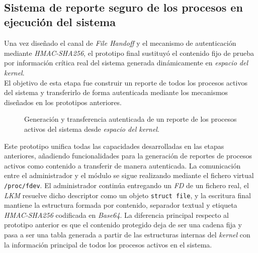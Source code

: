 \

\subsection{Sistema de reporte seguro de los procesos en ejecución del sistema}

Una vez diseñado el canal de \textit{File Handoff} y el mecanismo de autenticación mediante \textit{HMAC-SHA256}, el prototipo final sustituyó el contenido fijo de prueba por información crítica real del sistema generada dinámicamente en \textit{espacio del kernel}.\\

El objetivo de esta etapa fue construir un reporte de todos los procesos activos del sistema y transferirlo de forma autenticada mediante los mecanismos diseñados en los prototipos anteriores.

\newpage

\begin{figure}[h!]
  \centering
  \scalebox{0.95}{}
  \caption{Generación y transferencia autenticada de un reporte de los procesos activos del sistema desde \textit{espacio del kernel}.}
  \label{fig:final_report_scheme}
\end{figure}

Este prototipo unifica todas las capacidades desarrolladas en las etapas anteriores, añadiendo funcionalidades para la generación de reportes de procesos activos como contenido a transferir de manera autenticada.
La comunicación entre el administrador y el módulo se sigue realizando mediante el fichero virtual \texttt{/proc/fdev}. El administrador continúa entregando un \textit{FD} de un fichero real, el \textit{LKM} resuelve dicho descriptor como un objeto \texttt{struct file}, y la escritura final mantiene la estructura formada por contenido, separador textual y etiqueta \textit{HMAC-SHA256} codificada en \textit{Base64}.
La diferencia principal respecto al prototipo anterior es que el contenido protegido deja de ser una cadena fija y pasa a ser una tabla generada a partir de las estructuras internas del \textit{kernel} con la información principal de todos los procesos activos en el sistema.\\

